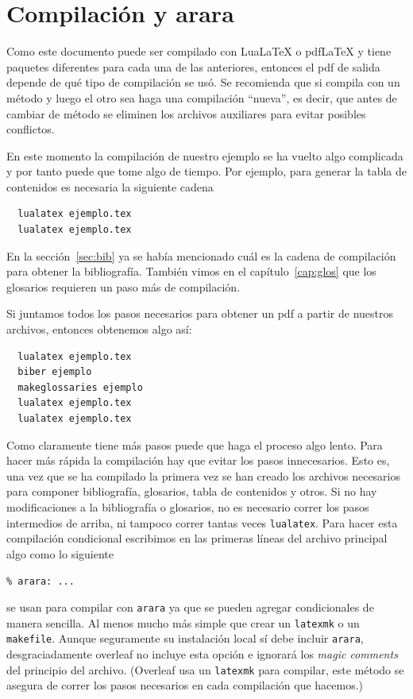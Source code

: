 
\chapter{Compilación y arara}
Como este documento puede ser compilado con Lua\LaTeX{} o pdf\LaTeX{} y tiene
paquetes diferentes para cada una de las anteriores, entonces el
pdf de salida depende de qué tipo de compilación se usó. Se recomienda que
si compila con un método y luego el otro sea haga una compilación
\enquote{nueva}, es decir, que antes de cambiar de
método se eliminen los archivos auxiliares para evitar posibles conflictos.

En este momento la compilación de nuestro ejemplo se ha vuelto algo complicada
y por tanto puede que tome algo de tiempo. Por ejemplo, para generar la tabla
de contenidos es necesaria la siguiente cadena
\begin{verbatim}
  lualatex ejemplo.tex
  lualatex ejemplo.tex
\end{verbatim}

En la sección~\ref{sec:bib} ya se había mencionado cuál es la cadena de
compilación para obtener la bibliografía. También vimos en el capítulo~\ref{cap:glos} que los glosarios requieren un paso más de compilación.

Si juntamos todos los pasos necesarios para obtener un pdf a partir de nuestros archivos, entonces obtenemos algo así:
\begin{verbatim}
  lualatex ejemplo.tex
  biber ejemplo
  makeglossaries ejemplo
  lualatex ejemplo.tex
  lualatex ejemplo.tex
\end{verbatim}
Como claramente tiene más pasos puede que haga el proceso algo lento.
Para hacer más rápida la compilación hay que evitar los pasos innecesarios.
Esto es, una vez que se ha compilado la primera vez se han creado los
archivos necesarios para componer bibliografía, glosarios, tabla de contenidos y
otros. Si no hay modificaciones a la bibliografía o glosarios, no es necesario
correr los pasos intermedios de arriba, ni tampoco correr tantas veces
\texttt{lualatex}. Para hacer esta compilación condicional escribimos
en las primeras líneas del archivo principal algo como lo siguiente
\begin{flushleft}
  \verb|% arara: ...|
\end{flushleft}
se usan para compilar con \texttt{arara} ya que se pueden agregar
condicionales de manera sencilla. Al menos mucho más simple que crear un
\texttt{latexmk} o un \texttt{makefile}. Aunque seguramente su instalación
local sí debe incluir \texttt{arara}, desgraciadamente overleaf no incluye
esta opción e ignorará los \textit{magic comments} del principio del archivo.
(Overleaf usa un \texttt{latexmk} para compilar, este método se asegura de
correr los pasos necesarios en cada compilación que hacemos.)

